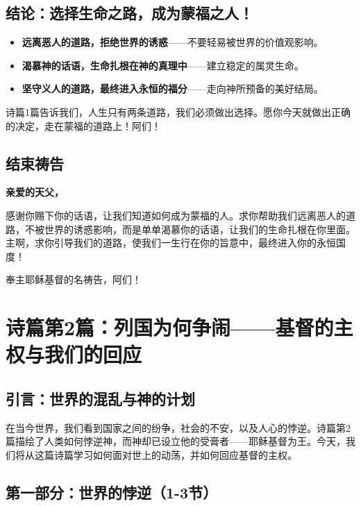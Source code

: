 \documentclass[a4paper, 12pt]{article}
\begin{document}
\subsection*{结论：选择生命之路，成为蒙福之人！}

\begin{itemize}
    \item \textbf{远离恶人的道路，拒绝世界的诱惑}——不要轻易被世界的价值观影响。
    \item \textbf{渴慕神的话语，生命扎根在神的真理中}——建立稳定的属灵生命。
    \item \textbf{坚守义人的道路，最终进入永恒的福分}——走向神所预备的美好结局。
\end{itemize}

诗篇1篇告诉我们，人生只有两条道路，我们必须做出选择。愿你今天就做出正确的决定，走在蒙福的道路上！阿们！

\subsection*{结束祷告}

\textbf{亲爱的天父，}

感谢你赐下你的话语，让我们知道如何成为蒙福的人。求你帮助我们远离恶人的道路，不被世界的诱惑影响，而是单单渴慕你的话语，让我们的生命扎根在你里面。主啊，求你引导我们的道路，使我们一生行在你的旨意中，最终进入你的永恒国度！

奉主耶稣基督的名祷告，阿们！



\newpage
\section{诗篇第2篇：列国为何争闹——基督的主权与我们的回应}

\subsection*{引言：世界的混乱与神的计划}

在当今世界，我们看到国家之间的纷争，社会的不安，以及人心的悖逆。诗篇第2篇描绘了人类如何悖逆神，而神却已设立他的受膏者——耶稣基督为王。今天，我们将从这篇诗篇学习如何面对世上的动荡，并如何回应基督的主权。

\subsection*{第一部分：世界的悖逆（1-3节）}
\end{document}
